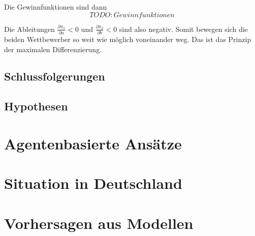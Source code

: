 Die Gewinnfunktionen sind dann
\begin{equation}
TODO: Gewinnfunktionen
\end{equation}

Die Ableitungen $\frac{\partial \pi_1}{\partial a}<0$ und $\frac{\partial \pi_2}{\partial b}<0$ sind also negativ. Somit bewegen sich die beiden Wettbewerber so weit wie möglich voneinander weg. Das ist das Prinzip der maximalen Differenzierung.

\subsection{Schlussfolgerungen}

\subsection{Hypothesen}

\section{Agentenbasierte Ansätze}\label{Sec-ABM}

\section{Situation in Deutschland}\label{Sec-Deutschland}

\section{Vorhersagen aus Modellen}\label{Sec-Vorhersagen}
